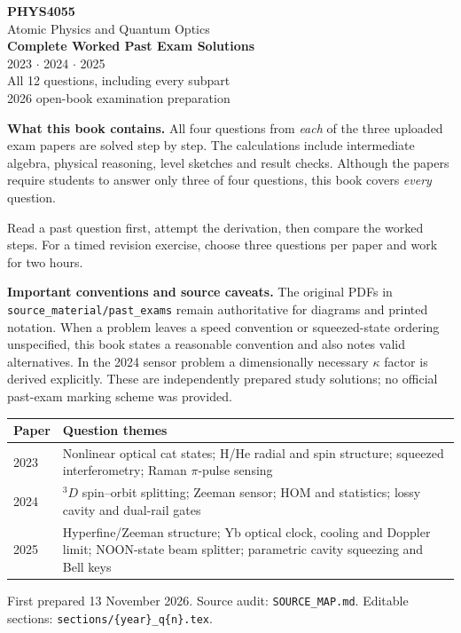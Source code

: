 \documentclass[10pt,a4paper]{article}
\begin{document}
\begin{center}
\vspace*{8mm}
{\Huge\bfseries\color{accent}PHYS4055}\\[4mm]
{\LARGE Atomic Physics and Quantum Optics}\\[7mm]
{\Large\bfseries Complete Worked Past Exam Solutions}\\[4mm]
{\Large 2023 \(\cdot\) 2024 \(\cdot\) 2025}\\[5mm]
{\normalsize All 12 questions, including every subpart}\\[4mm]
{\normalsize 2026 open-book examination preparation}
\end{center}
\vspace{8mm}
\begin{methodbox}
\textbf{What this book contains.}
All four questions from \emph{each} of the three
uploaded exam papers are solved step by step.
The calculations include intermediate algebra,
physical reasoning, level sketches and result
checks. Although the papers require students
to answer only three of four questions, this
book covers \emph{every} question.
\end{methodbox}
Read a past question first, attempt the
derivation, then compare the worked steps.
For a timed revision exercise, choose
three questions per paper and work for two hours.
\begin{cautionbox}
\textbf{Important conventions and source caveats.}
The original PDFs in \texttt{source\_material/past\_exams}
remain authoritative for diagrams and printed notation.
When a problem leaves a speed convention or squeezed-state
ordering unspecified, this book states a reasonable convention
and also notes valid alternatives. In the 2024 sensor
problem a dimensionally necessary \(\kappa\) factor is
derived explicitly. These are independently prepared
study solutions; no official past-exam marking scheme
was provided.
\end{cautionbox}
\vspace{4mm}
\begin{center}\small
\begin{tabularx}{\linewidth}{@{}lX@{}}
\toprule
\textbf{Paper}&\textbf{Question themes}\\\midrule
2023&
Nonlinear optical cat states; H/He radial and spin structure;
squeezed interferometry; Raman \(\pi\)-pulse sensing\\
2024&
\({}^3D\) spin--orbit splitting; Zeeman sensor;
HOM and statistics; lossy cavity and dual-rail gates\\
2025&
Hyperfine/Zeeman structure; Yb optical clock, cooling
and Doppler limit; NOON-state beam splitter;
parametric cavity squeezing and Bell keys\\
\bottomrule
\end{tabularx}
\end{center}
\vfill
{\footnotesize First prepared 13 November 2026.
Source audit: \texttt{SOURCE\_MAP.md}.
Editable sections: \texttt{sections/\{year\}\_q\{n\}.tex}.}
\clearpage
\tableofcontents
\end{document}
